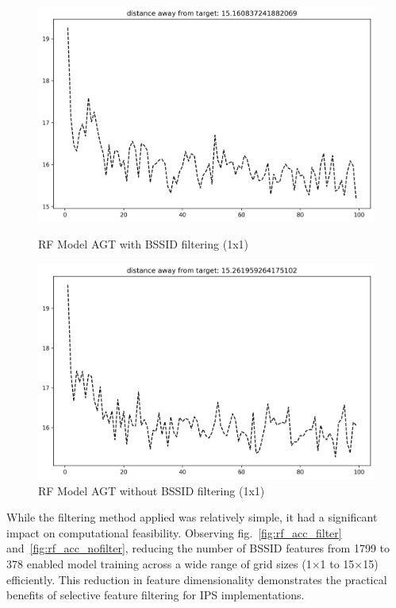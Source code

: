 \documentclass[runningheads]{llncs}
\begin{document}
\begin{figure}[hbt!]
	\begin{minipage}{0.45\textwidth}
		\centering
		\includegraphics[width=\linewidth]{image4.png}
		\caption{RF Model AGT with BSSID filtering (1x1)}
		\label{fig:rf_agt_filter}
	\end{minipage}
	\hfill
	\begin{minipage}{0.45\textwidth}
		\centering
		\includegraphics[width=\linewidth]{image7.png}
		\caption{RF Model AGT without BSSID filtering (1x1)}
		\label{fig:rf_agt_nofilter}
	\end{minipage}
\end{figure}

While the filtering method applied was relatively simple, it had a significant impact on computational feasibility. Observing fig.~\ref{fig:rf_acc_filter} and~\ref{fig:rf_acc_nofilter}, reducing the number of BSSID features from 1799 to 378 enabled model training across a wide range of grid sizes (1×1 to 15×15) efficiently. This reduction in feature dimensionality demonstrates the practical benefits of selective feature filtering for IPS implementations.
\end{document}
